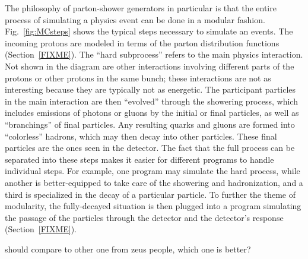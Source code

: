 

The philosophy of parton-shower generators 
in particular 
is that the entire process of simulating 
a physics event can be done in a modular fashion.  
Fig.~\ref{fig:MCsteps} 
shows the typical steps necessary to simulate an events.  
The incoming protons are modeled in terms of the 
parton distribution functions (Section~\ref{FIXME}).  %
The ``hard subprocess'' refers to the main 
physics interaction.  
Not shown in the diagram are other interactions 
involving different parts of the protons 
or other protons in the same bunch; 
these interactions are not as interesting 
because they are typically not as energetic.  
The participant particles in the main interaction 
are then ``evolved'' through the showering process, 
which includes emissions of photons or gluons 
by the initial or final particles, 
as well as ``branchings'' of final particles. %
Any resulting quarks and gluons are 
formed into ``colorless'' hadrons, 
which may then decay into other particles. 
These final particles are the ones seen 
in the detector.  
The fact that the full process can be separated 
into these steps 
makes it easier for different programs 
to handle individual steps.  
For example, one program may simulate the 
hard process, 
while another is better-equipped to take care 
of the showering and hadronization, 
and a third is specialized in the decay of 
a particular particle.  
To further the theme of modularity, 
the fully-decayed situation 
is then plugged into a program simulating 
the passage of the particles through the detector 
and the detector's response (Section~\ref{FIXME}).  


should compare to other one from zeus people, which one is better? 

